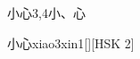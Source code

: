 \begin{entry}{小心}{3,4}{⼩、⼼}
  \begin{phonetics}{小心}{xiao3xin1}[][HSK 2]
  \end{phonetics}
\end{entry}
